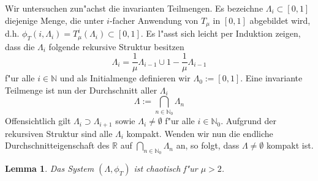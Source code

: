 \documentclass[a4paper, 13pt]{scrreprt}
\newtheorem{lemma}[theorem]{Lemma}
\theoremstyle{definition} \newtheorem{definition}{Definition}[section]
\newcommand{\RR}{\mathbb{R}}
\begin{document}
Wir untersuchen zun"achst die invarianten Teilmengen. Es bezeichne $\Lambda_i\subset[0,1]$ diejenige Menge, die unter $i$-facher Anwendung von $T_\mu$ in $[0,1]$ abgebildet wird, d.h. $\phi_T(i, \Lambda_i) = T_\mu^i(\Lambda_i) \subset [0,1]$. Es l"asst sich leicht per Induktion zeigen, dass die $\Lambda_i$ folgende rekursive Struktur besitzen
$$\Lambda_i = \frac 1\mu \Lambda_{i-1} \cup 1 - \frac 1\mu \Lambda_{i-1}$$
f"ur alle $i \in \mathbb{N}$ und als Initialmenge definieren wir $\Lambda_0 := [0,1]$. Eine invariante Teilmenge ist nun der Durchschnitt aller $\Lambda_i$
$$ \Lambda := \bigcap_{n\in\mathbb{N}_0} \Lambda_n$$
Offensichtlich gilt $\Lambda_i \supset \Lambda_{i+1}$ sowie $\Lambda_i \neq \emptyset$ f"ur alle $i\in\mathbb{N}_0$. Aufgrund der rekursiven Struktur sind alle $\Lambda_i$ kompakt. Wenden wir nun die endliche Durchschnitteigenschaft des $\RR$ auf $\bigcap_{n\in\mathbb{N}_0} \Lambda_n$ an, so folgt, dass 
$\Lambda \neq \emptyset$ kompakt ist.
\begin{lemma}
Das System $(\Lambda, \phi_T)$ ist chaotisch f"ur $\mu > 2$.
\end{lemma}
\end{document}
